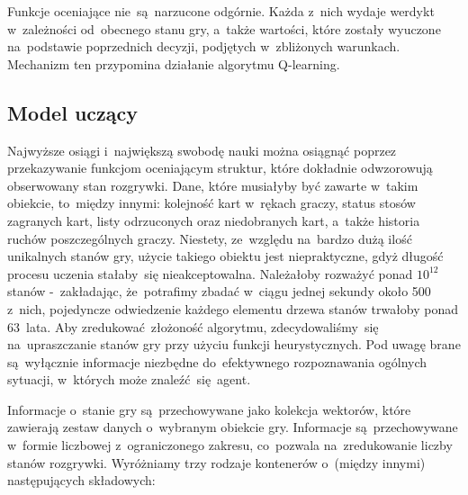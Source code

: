 \documentclass[declaration,shortabstract,inz]{iithesis}
\begin{document}
Funkcje oceniające nie~są~narzucone odgórnie. Każda z~nich wydaje werdykt w~zależności od~obecnego stanu gry, a~także wartości, które zostały wyuczone na~podstawie poprzednich decyzji, podjętych w~zbliżonych warunkach. Mechanizm ten przypomina działanie algorytmu Q-learning.

\subsection*{Model uczący}

Najwyższe osiągi i~największą swobodę nauki można osiągnąć poprzez przekazywanie funkcjom oceniającym struktur, które dokładnie odwzorowują obserwowany stan rozgrywki. Dane, które musiałyby być zawarte w~takim obiekcie, to~między innymi: kolejność kart w~rękach graczy, status stosów zagranych kart, listy odrzuconych oraz niedobranych kart, a~także historia ruchów poszczególnych graczy. Niestety, ze~względu na~bardzo dużą ilość unikalnych stanów gry, użycie takiego obiektu jest niepraktyczne, gdyż długość procesu uczenia stałaby~się nieakceptowalna. Należałoby rozważyć ponad $10^{12}$ stanów -~zakładając, że~potrafimy zbadać w~ciągu jednej sekundy około 500 z~nich, pojedyncze odwiedzenie każdego elementu drzewa stanów trwałoby ponad 63~lata. Aby zredukować złożoność algorytmu, zdecydowaliśmy~się na~upraszczanie stanów gry przy użyciu funkcji heurystycznych. Pod uwagę brane są~wyłącznie informacje niezbędne do~efektywnego rozpoznawania ogólnych sytuacji, w~których może znaleźć~się agent.

Informacje o~stanie gry są~przechowywane jako kolekcja wektorów, które zawierają zestaw danych o~wybranym obiekcie gry. Informacje są~przechowywane w~formie liczbowej z~ograniczonego zakresu, co~pozwala na~zredukowanie liczby stanów rozgrywki. Wyróżniamy trzy rodzaje kontenerów o~(między innymi) następujących składowych:
\end{document}
